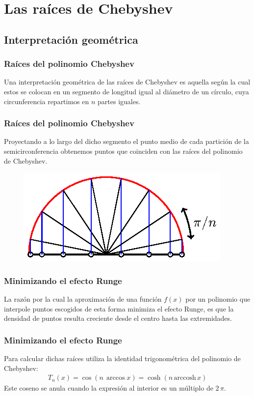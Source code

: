 \documentclass[12pt]{beamer}
\begin{document}
\section{Las raíces de Chebyshev}
\subsection{Interpretación geométrica}

\begin{frame}
\frametitle{Raíces del polinomio Chebyshev}
Una interpretación geométrica de las raíces de Chebyshev es aquella según la cual estos se colocan en un segmento de longitud igual al diámetro de un círculo, cuya circunferencia repartimos en $n$ partes iguales.
\end{frame}
\begin{frame}
\frametitle{Raíces del polinomio Chebyshev}
Proyectando a lo largo del dicho segmento el punto medio de cada partición de la semicirconferencia obtenemos puntos que coinciden con las raíces del polinomio de Chebyshev.
\begin{figure}
    \centering
    \includegraphics[scale=1]{Imagenes/Nodos_Chebychev_01.eps}
\end{figure}
\end{frame}
\begin{frame}
\frametitle{Minimizando el efecto Runge}
La razón por la cual la aproximación de una función $f (x)$ por un polinomio que interpole puntos escogidos de esta forma minimiza el efecto Runge, \pause es que la densidad de puntos resulta creciente desde el centro hasta las extremidades.
\end{frame}
\begin{frame}
\frametitle{Minimizando el efecto Runge}
Para calcular dichas raíces utiliza la identidad trigonométrica del polinomio de Chebyshev:
\pause
\begin{align*}
T_{n}(x) = \cos (n \, \arccos x) = \cosh (n \, \mbox{arccosh} \, x)
\end{align*}
\pause
Este coseno se anula cuando la expresión al interior es un múltiplo de $2 \, \pi$.
\end{frame}
\end{document}
